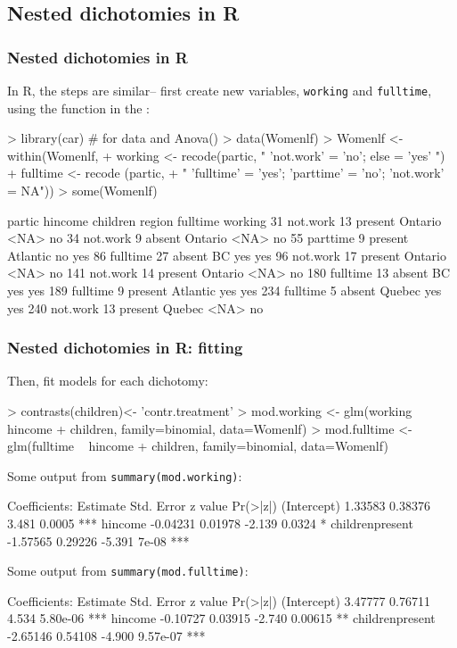 \renewcommand{\FileName}{nestedR}
\subsection{Nested dichotomies in R}
\begin{frame}[fragile]
  \frametitle{Nested dichotomies in R}
  In R, the steps are similar-- first create new variables, \texttt{working} and \texttt{fulltime}, using the
   function in the :
\begin{Rin}
> library(car)   # for data and Anova()
> data(Womenlf)
> Womenlf <- within(Womenlf,{
+   working <- recode(partic, " 'not.work' = 'no'; else = 'yes' ")
+   fulltime <- recode (partic, 
+     " 'fulltime' = 'yes'; 'parttime' = 'no'; 'not.work' = NA")})
> some(Womenlf)
\end{Rin}

\begin{Rout}[baselinestretch=0.8,fontsize=\footnotesize]
      partic hincome children   region fulltime working
31  not.work      13  present  Ontario     <NA>      no
34  not.work       9   absent  Ontario     <NA>      no
55  parttime       9  present Atlantic       no     yes
86  fulltime      27   absent       BC      yes     yes
96  not.work      17  present  Ontario     <NA>      no
141 not.work      14  present  Ontario     <NA>      no
180 fulltime      13   absent       BC      yes     yes
189 fulltime       9  present Atlantic      yes     yes
234 fulltime       5   absent   Quebec      yes     yes
240 not.work      13  present   Quebec     <NA>      no
\end{Rout}
\end{frame}

\begin{frame}[fragile]
  \frametitle{Nested dichotomies in R: fitting}
  Then, fit models for each dichotomy:
\begin{Rin}
> contrasts(children)<- 'contr.treatment'
> mod.working <- glm(working ~ hincome + children, family=binomial, data=Womenlf)
> mod.fulltime <- glm(fulltime ~ hincome + children, family=binomial, data=Womenlf)
\end{Rin}
Some output from \texttt{summary(mod.working)}:
\begin{Rout}[frame=single]
Coefficients:
                Estimate Std. Error z value Pr(>|z|)    
(Intercept)      1.33583    0.38376   3.481   0.0005 ***
hincome         -0.04231    0.01978  -2.139   0.0324 *  
childrenpresent -1.57565    0.29226  -5.391    7e-08 ***
\end{Rout}
Some output from \texttt{summary(mod.fulltime)}:
\begin{Rout}[frame=single] 
Coefficients:
                Estimate Std. Error z value Pr(>|z|)    
(Intercept)      3.47777    0.76711   4.534 5.80e-06 ***
hincome         -0.10727    0.03915  -2.740  0.00615 ** 
childrenpresent -2.65146    0.54108  -4.900 9.57e-07 ***
\end{Rout}
\end{frame}

